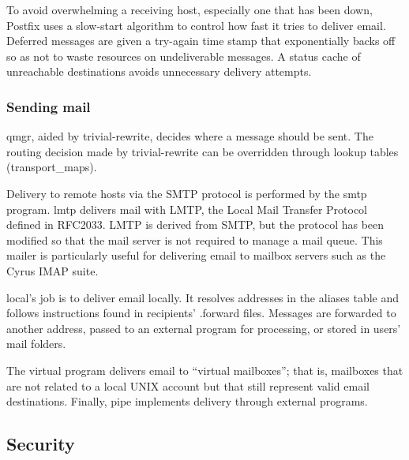 To avoid overwhelming a receiving host, especially one that has been
down, Postfix uses a slow-start algorithm to control how fast it tries
to deliver email. Deferred messages are given a try-again time stamp
that exponentially backs off so as not to waste resources on
undeliverable messages. A status cache of unreachable destinations
avoids unnecessary delivery attempts.

\subsubsection[Sending
mail]{\texorpdfstring{\protect\hypertarget{part0026_split_058.htmlux5cux23_idTextAnchor1169}{}{}Sending
mail}{Sending mail}}

\protect\hypertarget{part0026_split_058.htmlux5cux23_idIndexMarker2691}{}{}{qmgr},
aided by {trivial-rewrite}, decides where a message should be sent. The
routing decision made by {trivial-rewrite }can be overridden through
lookup tables ({transport\_maps}).

Delivery to remote hosts via the SMTP protocol is performed by the
{smtp} program.
\protect\hypertarget{part0026_split_058.htmlux5cux23_idIndexMarker2692}{}{}{lmtp}
delivers mail with
\protect\hypertarget{part0026_split_058.htmlux5cux23_idIndexMarker2693}{}{}\protect\hypertarget{part0026_split_058.htmlux5cux23_idIndexMarker2694}{}{}LMTP,
the Local Mail Transfer Protocol defined in RFC2033. LMTP is derived
from SMTP, but the protocol has been modified so that the mail server is
not required to manage a mail queue. This mailer is particularly useful
for delivering email to mailbox servers such as the Cyrus IMAP suite.

\protect\hypertarget{part0026_split_058.htmlux5cux23_idIndexMarker2695}{}{}{local}'s
job is to deliver email locally. It resolves addresses in the
\protect\hypertarget{part0026_split_058.htmlux5cux23_idIndexMarker2696}{}{}{aliases}
table and follows instructions found in recipients' {.forward} files.
Messages are forwarded to another address, passed to an external program
for processing, or stored in users' mail folders.

The {virtual} program delivers email to ``virtual mailboxes''; that is,
mailboxes that are not related to a local UNIX account but that still
represent valid email destinations. Finally, {pipe} implements delivery
through external programs.

\protect\hypertarget{part0026_split_059.html}{}{}

\hypertarget{part0026_split_059.htmlux5cux23_idContainer1247}{}
\hypertarget{part0026_split_059.htmlux5cux23calibre_pb_58}{%
\subsection[Security]{\texorpdfstring{Securi\protect\hypertarget{part0026_split_059.htmlux5cux23_idTextAnchor1170}{}{}ty}{Security}}\label{part0026_split_059.htmlux5cux23calibre_pb_58}}

